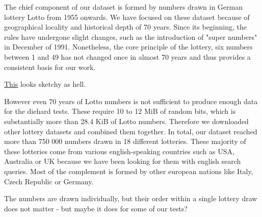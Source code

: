 The chief component of our dataset is formed by numbers drawn in German lottery Lotto from 1955 onwards. We have focused on these dataset because of geographical locality
and historical depth of 70 years. Since its beginning, the rules have undergone slight changes, such as the introduction of "super numbers" in December
of 1991. Nonetheless, the core principle of the lottery, six numbers between 1 and 49 has not changed once in almost 70 years and thus provides a consistent
basis for our work.

 \href{https://notebook.community/JesseScott/Lotto649/lotto}{This} looks sketchy as hell.

However even 70 years of Lotto numbers is not sufficient to produce enough data for the diehard tests. These require 10 to 12 MiB of random bits, which is
substantially more than 28.4 KiB of Lotto numbers. Therefore we downloaded other lottery datasets and combined them together. In total, our dataset reached
more than 750 000 numbers drawn in 18 different lotteries. These majority of these lotteries come from various english-speaking countries such as USA,
Australia or UK because we have been looking for them with english search queries. Most of the complement is formed by other european nations like Italy,
Czech Republic or Germany.


The numbers are drawn individually, but their order within a single lottery draw does not matter - but maybe it does for some of our tests?

